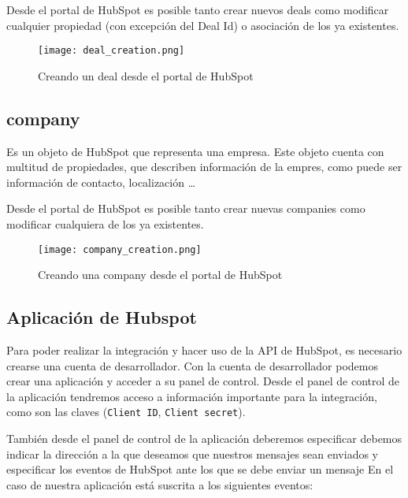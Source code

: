 		Desde el portal de HubSpot es posible tanto crear nuevos deals como modificar cualquier propiedad (con excepción del Deal Id) o asociación de los ya existentes.
		
		\begin{figure}
			\centering
			\texttt{[image: deal\_creation.png]}
			\caption{Creando un deal desde el portal de HubSpot}
		\end{figure}

\subsection{company}
		
		Es un objeto de HubSpot que representa una empresa. Este objeto cuenta con multitud de propiedades, que describen información de la empres, como puede ser información de contacto, localización \ldots 
		
		Desde el portal de HubSpot es posible tanto crear nuevas companies como modificar cualquiera de los ya existentes.
		
		\begin{figure}
			\centering
			\texttt{[image: company\_creation.png]}
			\caption{Creando una company desde el portal de HubSpot}
		\end{figure}


\subsection{Aplicación de Hubspot}
\label{subsec:app_hs}
Para poder realizar la integración y hacer uso de la API de HubSpot, es necesario crearse una cuenta de desarrollador. Con la cuenta de desarrollador podemos crear una aplicación y acceder a su panel de control. 
Desde el panel de control de la aplicación tendremos acceso a información importante para la integración, como son las claves (\verb|Client ID|, \verb|Client secret|).


También desde el panel de control de la aplicación deberemos especificar debemos indicar la dirección a la que deseamos que nuestros mensajes sean enviados y especificar los eventos de HubSpot ante los que se debe enviar un mensaje
En el caso de nuestra aplicación está suscrita a los siguientes eventos:


